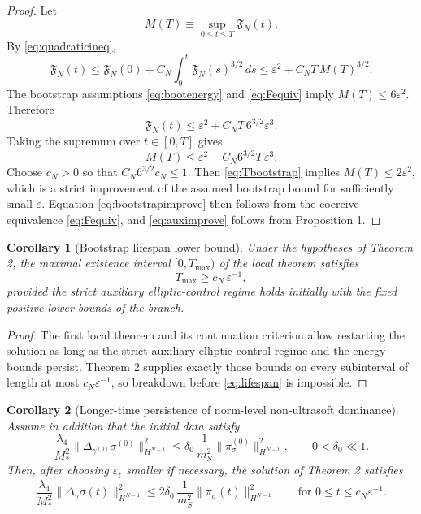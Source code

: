 \documentclass[11pt]{article}
\newtheorem{corollary}{Corollary}
\begin{document}
\begin{proof}
Let
\[
M(T)\equiv \sup_{0\le t\le T}\mathfrak F_N(t).
\]
By \eqref{eq:quadraticineq},
\[
\mathfrak F_N(t)
\le
\mathfrak F_N(0)+C_N\int_0^t \mathfrak F_N(s)^{3/2}\,ds
\le
\varepsilon^2+C_N T\,M(T)^{3/2}.
\]
The bootstrap assumptions \eqref{eq:bootenergy} and \eqref{eq:Fequiv} imply \(M(T)\le 6\varepsilon^2\). Therefore
\[
\mathfrak F_N(t)
\le
\varepsilon^2+C_N T\,6^{3/2}\varepsilon^3.
\]
Taking the supremum over \(t\in[0,T]\) gives
\[
M(T)\le \varepsilon^2 + C_N 6^{3/2} T\,\varepsilon^3.
\]
Choose \(c_N>0\) so that \(C_N 6^{3/2} c_N\le 1\). Then \eqref{eq:Tbootstrap} implies \(M(T)\le 2\varepsilon^2\), which is a strict improvement of the assumed bootstrap bound for sufficiently small \(\varepsilon\). Equation \eqref{eq:bootstrapimprove} then follows from the coercive equivalence \eqref{eq:Fequiv}, and \eqref{eq:auximprove} follows from Proposition 1.
\end{proof}

\begin{corollary}[Bootstrap lifespan lower bound]
Under the hypotheses of Theorem 2, the maximal existence interval \([0,T_{\max})\) of the local theorem satisfies
\begin{equation}
T_{\max}\ge c_N\,\varepsilon^{-1},
\label{eq:lifespan}
\end{equation}
provided the strict auxiliary elliptic-control regime holds initially with the fixed positive lower bounds of the branch.
\end{corollary}

\begin{proof}
The first local theorem and its continuation criterion allow restarting the solution as long as the strict auxiliary elliptic-control regime and the energy bounds persist. Theorem 2 supplies exactly those bounds on every subinterval of length at most \(c_N\varepsilon^{-1}\), so breakdown before \eqref{eq:lifespan} is impossible.
\end{proof}

\begin{corollary}[Longer-time persistence of norm-level non-ultrasoft dominance]
Assume in addition that the initial data satisfy
\begin{equation}
\frac{\lambda_4}{M_*^2}\|\Delta_{\gamma^{(0)}}\sigma^{(0)}\|_{H^{N-1}}^2
\le
\delta_0\,
\frac{1}{m_S^2}\|\pi_\sigma^{(0)}\|_{H^{N-1}}^2,
\qquad
0<\delta_0\ll 1.
\label{eq:initdominance}
\end{equation}
Then, after choosing \(\varepsilon_\sharp\) smaller if necessary, the solution of Theorem 2 satisfies
\begin{equation}
\frac{\lambda_4}{M_*^2}\|\Delta_\gamma\sigma(t)\|_{H^{N-1}}^2
\le
2\delta_0\,
\frac{1}{m_S^2}\|\pi_\sigma(t)\|_{H^{N-1}}^2
\qquad
\text{for }0\le t\le c_N\varepsilon^{-1}.
\label{eq:longdominance}
\end{equation}
\end{corollary}
\end{document}
